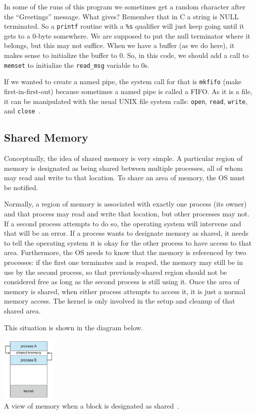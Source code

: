 \documentclass[a4paper]{report}
\begin{document}
In some of the runs of this program we sometimes get a random character after the ``Greetings'' message. What gives? Remember that in C a string is NULL terminated. So a \texttt{printf} routine with a \texttt{\%s} qualifier will just keep going until it gets to a 0-byte somewhere. We are supposed to put the null terminator where it belongs, but this may not suffice. When we have a buffer (as we do here), it makes sense to initialize the buffer to 0. So, in this code, we should add a call to \texttt{memset} to initialize the \texttt{read\_msg} variable to 0s.

If we wanted to create a named pipe, the system call for that is \texttt{mkfifo} (make first-in-first-out) because sometimes a named pipe is called a FIFO. As it is a file, it can be manipulated with the usual UNIX file system calls: \texttt{open}, \texttt{read}, \texttt{write}, and \texttt{close}~\cite{osc}.


\subsection*{Shared Memory}
Conceptually, the idea of shared memory is very simple. A particular region of memory is designated as being shared between multiple processes, all of whom may read and write to that location. To share an area of memory, the OS must be notified.

Normally, a region of memory is associated with exactly one process (its owner) and that process may read and write that location, but other processes may not. If a second process attempts to do so, the operating system will intervene and that will be an error. If a process wants to designate memory as shared, it needs to tell the operating system it is okay for the other process to have access to that area. Furthermore, the OS needs to know that the memory is referenced by two processes: if the first one terminates and is reaped, the memory may still be in use by the second process, so that previously-shared region should not be considered free as long as the second process is still using it. Once the area of memory is shared, when either process attempts to access it, it is just a normal memory access. The kernel is only involved in the setup and cleanup of that shared area.

This situation is shown in the diagram below.

\begin{center}
	\includegraphics[width=0.2\textwidth]{images/shared-memory.png}\\
	A view of memory when a block is designated as shared~\cite{osc}.
\end{center}
\end{document}
